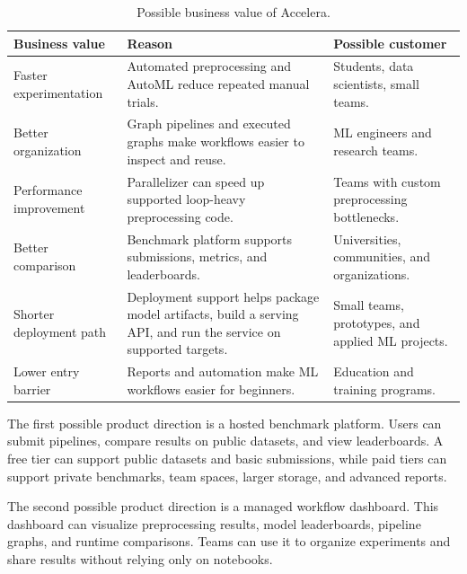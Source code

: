 \documentclass[12pt,a4paper]{report}
\newcommand{\acceleraTableStyle}{%
\small
\renewcommand{\arraystretch}{1.15}
\setlength{\tabcolsep}{4pt}%
}
\begin{document}
\begin{table}[!htbp]
\centering
\acceleraTableStyle
\caption{Possible business value of Accelera.}
\label{tab:business-value}
\begin{tabular}{p{}p{}p{}}
\toprule
\textbf{Business value} & \textbf{Reason} & \textbf{Possible customer} \\
\midrule

Faster experimentation &
Automated preprocessing and AutoML reduce repeated manual trials. &
Students, data scientists, small teams. \\
\midrule

Better organization &
Graph pipelines and executed graphs make workflows easier to inspect and reuse. &
ML engineers and research teams. \\
\midrule

Performance improvement &
Parallelizer can speed up supported loop-heavy preprocessing code. &
Teams with custom preprocessing bottlenecks. \\
\midrule

Better comparison &
Benchmark platform supports submissions, metrics, and leaderboards. &
Universities, communities, and organizations. \\
\midrule

Shorter deployment path &
Deployment support helps package model artifacts, build a serving API, and run
the service on supported targets. &
Small teams, prototypes, and applied ML projects. \\
\midrule

Lower entry barrier &
Reports and automation make ML workflows easier for beginners. &
Education and training programs. \\

\bottomrule
\end{tabular}
\end{table}

The first possible product direction is a hosted benchmark platform. Users can
submit pipelines, compare results on public datasets, and view leaderboards. A
free tier can support public datasets and basic submissions, while paid tiers can
support private benchmarks, team spaces, larger storage, and advanced reports.

The second possible product direction is a managed workflow dashboard. This
dashboard can visualize preprocessing results, model leaderboards, pipeline
graphs, and runtime comparisons. Teams can use it to organize experiments and
share results without relying only on notebooks.
\end{document}
